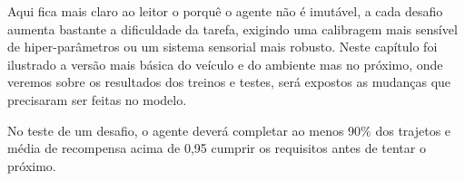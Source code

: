 Aqui fica mais claro ao leitor o porquê o agente não é imutável, a cada desafio aumenta bastante a dificuldade da tarefa, exigindo uma calibragem mais sensível de hiper-parâmetros ou um sistema sensorial mais robusto. Neste capítulo foi ilustrado a versão mais básica do veículo e do ambiente mas no próximo, onde veremos sobre os resultados dos treinos e testes, será expostos as mudanças que precisaram ser feitas no modelo.

No teste de um desafio, o agente deverá completar ao menos 90\% dos trajetos e média de recompensa acima de 0,95 cumprir os requisitos antes de tentar o próximo. 

 